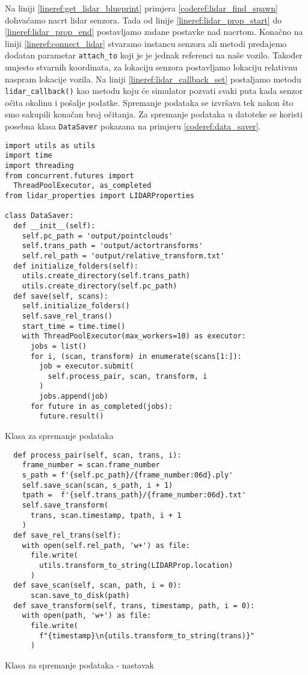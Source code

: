 Na liniji \ref{lineref:get_lidar_blueprint} primjera \ref{coderef:lidar_find_spawn} dohvaćamo nacrt lidar senzora. Tada od linije \ref{lineref:lidar_prop_start} do \ref{lineref:lidar_prop_end} postavljamo zadane postavke nad nacrtom. Konačno na liniji \ref{lineref:connect_lidar} stvaramo instancu senzora ali metodi predajemo dodatan parametar \texttt{attach_to} koji je je jednak referenci na naše vozilo. Također umjesto stvarnih koordinata, za lokaciju senzora postavljamo lokaciju relativnu naspram lokacije vozila. Na liniji \ref{lineref:lidar_callback_set} postaljamo metodu \texttt{lidar_callback()} kao metodu koju će simulator pozvati svaki puta kada senzor očita okolinu i pošalje podatke.
Spremanje podataka se izvršava tek nakon što smo sakupili konačan broj očitanja. Za spremanje podataka u datoteke se koristi posebna klasa \texttt{DataSaver} pokazana na primjeru \ref{coderef:data_saver}.

\begin{listing}[h!]
  \begin{verbatim}
import utils as utils
import time
import threading
from concurrent.futures import
  ThreadPoolExecutor, as_completed
from lidar_properties import LIDARProperties

class DataSaver:
  def __init__(self):
    self.pc_path = 'output/pointclouds'
    self.trans_path = 'output/actortransforms'
    self.rel_path = 'output/relative_transform.txt'
  def initialize_folders(self):
    utils.create_directory(self.trans_path)
    utils.create_directory(self.pc_path)
  def save(self, scans):
    self.initialize_folders()
    self.save_rel_trans()
    start_time = time.time()
    with ThreadPoolExecutor(max_workers=10) as executor:
      jobs = list()
      for i, (scan, transform) in enumerate(scans[1:]):
        job = executor.submit(
          self.process_pair, scan, transform, i
        )
        jobs.append(job)
      for future in as_completed(jobs):
        future.result()
  \end{verbatim}
  \caption{Klasa za spremanje podataka}
  \label{coderef:data_saver}
\end{listing}

\begin{listing}[h!]
  \begin{verbatim}
  def process_pair(self, scan, trans, i):
    frame_number = scan.frame_number
    s_path = f'{self.pc_path}/{frame_number:06d}.ply'
    self.save_scan(scan, s_path, i + 1)
    tpath =  f'{self.trans_path}/{frame_number:06d}.txt'
    self.save_transform(
      trans, scan.timestamp, tpath, i + 1
    )
  def save_rel_trans(self):
    with open(self.rel_path, 'w+') as file:
      file.write(
        utils.transform_to_string(LIDARProp.location)
      )
  def save_scan(self, scan, path, i = 0):
      scan.save_to_disk(path)
  def save_transform(self, trans, timestamp, path, i = 0):
    with open(path, 'w+') as file:
      file.write(
        f"{timestamp}\n{utils.transform_to_string(trans)}"
      )
  \end{verbatim}
  \caption{Klasa za spremanje podataka - nastavak}
  \label{coderef:data_saver_cont}
\end{listing}


